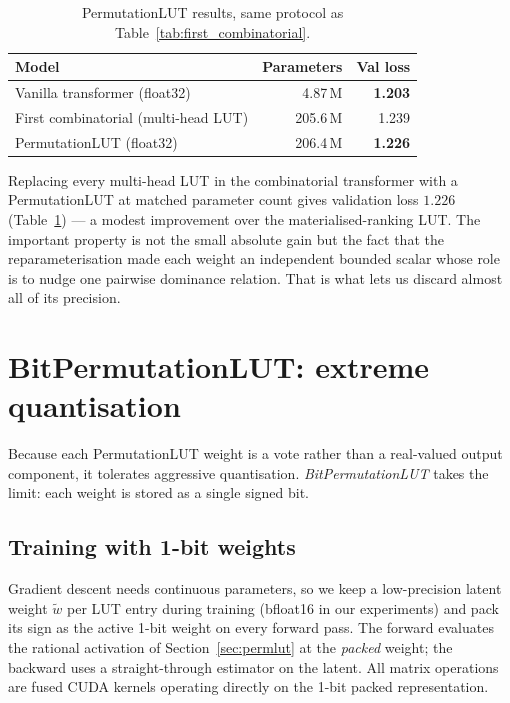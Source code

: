 \documentclass[11pt]{article}
\begin{document}
\begin{table}[!t]
\caption{PermutationLUT results, same protocol as Table~\ref{tab:first_combinatorial}.}
\label{tab:permlut}
\centering
\begin{tabular}{lrr}
\toprule
Model & Parameters & Val loss \\
\midrule
Vanilla transformer (float32)      & 4.87\,M   & \textbf{1.203} \\
First combinatorial (multi-head LUT)& 205.6\,M  & 1.239 \\
PermutationLUT (float32)            & 206.4\,M  & \textbf{1.226} \\
\bottomrule
\end{tabular}
\end{table}

Replacing every multi-head LUT in the combinatorial transformer with a PermutationLUT at matched parameter count gives validation loss $1.226$ (Table~\ref{tab:permlut}) --- a modest improvement over the materialised-ranking LUT.
The important property is not the small absolute gain but the fact that the reparameterisation made each weight an independent bounded scalar whose role is to nudge one pairwise dominance relation.
That is what lets us discard almost all of its precision.


\section{BitPermutationLUT: extreme quantisation}
\label{sec:bitperm}

Because each PermutationLUT weight is a vote rather than a real-valued output component, it tolerates aggressive quantisation.
\emph{BitPermutationLUT} takes the limit: each weight is stored as a single signed bit.

\subsection{Training with 1-bit weights}

Gradient descent needs continuous parameters, so we keep a low-precision latent weight $\tilde{w}$ per LUT entry during training (bfloat16 in our experiments) and pack its sign as the active 1-bit weight on every forward pass.
The forward evaluates the rational activation of Section~\ref{sec:permlut} at the \emph{packed} weight; the backward uses a straight-through estimator on the latent.
All matrix operations are fused CUDA kernels operating directly on the 1-bit packed representation.
\end{document}
